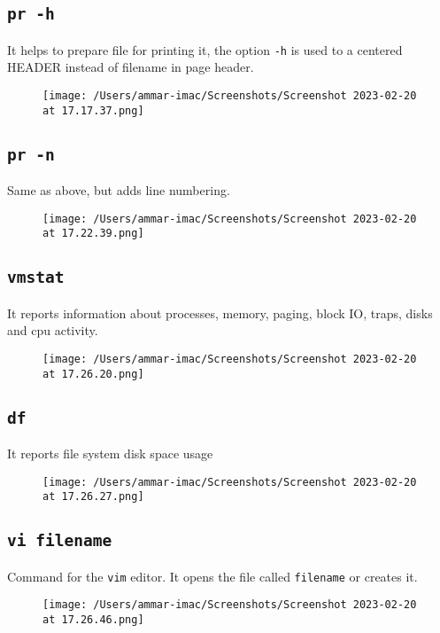 \documentclass{article}
\def\code#1{\texttt{#1}}
\begin{document}
\subsection{\code{pr -h}}%
It helps to prepare file for printing it, the option \code{-h} is
used to a centered HEADER instead of filename in page header.
\begin{figure}[ht]
  \centering
  \texttt{[image: /Users/ammar-imac/Screenshots/Screenshot 2023-02-20 at 17.17.37.png]}
\end{figure}

\newpage

\subsection{\code{pr -n}}%
Same as above, but adds line numbering.
\begin{figure}[ht]
  \centering
  \texttt{[image: /Users/ammar-imac/Screenshots/Screenshot 2023-02-20 at 17.22.39.png]}
\end{figure}


\subsection{\code{vmstat}}%
It reports  information  about processes, memory, paging, block IO, traps,
disks and cpu activity.
\begin{figure}[ht]
  \centering
  \texttt{[image: /Users/ammar-imac/Screenshots/Screenshot 2023-02-20 at 17.26.20.png]}
\end{figure}

\subsection{\code{df}}%
It reports file system disk space usage
\begin{figure}[ht]
  \centering
  \texttt{[image: /Users/ammar-imac/Screenshots/Screenshot 2023-02-20 at 17.26.27.png]}
\end{figure}

\newpage

\subsection{\code{vi filename}}%
Command for the \code{vim} editor. It opens the file called \code{filename} or creates it.
\begin{figure}[ht]
  \centering
  \texttt{[image: /Users/ammar-imac/Screenshots/Screenshot 2023-02-20 at 17.26.46.png]}
\end{figure}
\end{document}
